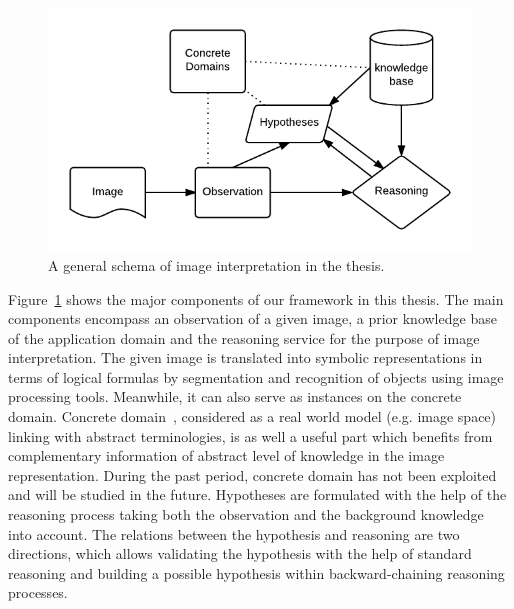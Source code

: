 \documentclass{article}
\begin{document}

\begin{figure}[h]
  \centering
   \includegraphics[scale=.8]{./figures/schemageneral.pdf}
   \caption{\label{fig:intro_schema} A general schema of image interpretation in the thesis.}
 \end{figure} 

Figure~\ref{fig:intro_schema} shows the major components of our framework in this thesis. 
The main components encompass an observation of a given image, a prior knowledge base of the application domain and the reasoning service for the purpose of image interpretation. 
The given image is translated into symbolic representations in terms of logical formulas by segmentation and recognition of objects using image processing tools.
Meanwhile, it can also serve as instances on the concrete domain.
Concrete domain~\cite{carsten2005keys}, considered as a real world model (e.g. image space) linking with abstract terminologies, 
is as well a useful part which benefits from complementary information of abstract level of knowledge in the image representation.
During the past period, concrete domain has not been exploited and will be studied in the future.
Hypotheses are formulated with the help of the reasoning process taking both the observation and the background knowledge into account.
The relations between the hypothesis and reasoning are two directions, which allows validating the hypothesis with the help of standard reasoning and
building a possible hypothesis within backward-chaining reasoning processes.
\end{document}

